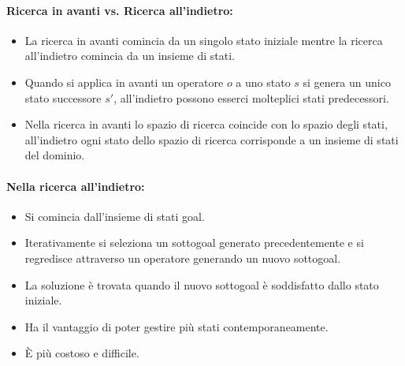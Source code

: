 \paragraph{Ricerca in avanti vs. Ricerca all'indietro:}

\begin{itemize}
  \item La ricerca in avanti comincia da un singolo stato iniziale mentre la ricerca all'indietro comincia da un insieme di stati. 
  \item Quando si applica in avanti un operatore $o$ a uno stato $s$ si genera un unico stato successore $s'$, all'indietro possono esserci molteplici stati predecessori. 
  \item Nella ricerca in avanti lo spazio di ricerca coincide con lo spazio degli stati, all'indietro ogni stato dello spazio di ricerca corrisponde a un insieme di stati del dominio.
\end{itemize}


\paragraph{Nella ricerca all'indietro:}

\begin{itemize}
  \item Si comincia dall'insieme di stati goal. 
  \item Iterativamente si seleziona un sottogoal generato precedentemente e si regredisce attraverso un operatore generando un nuovo sottogoal. 
  \item La soluzione è trovata quando il nuovo sottogoal è soddisfatto dallo stato iniziale. 
  \item Ha il vantaggio di poter gestire più stati contemporaneamente. 
  \item È più costoso e difficile.
\end{itemize}

